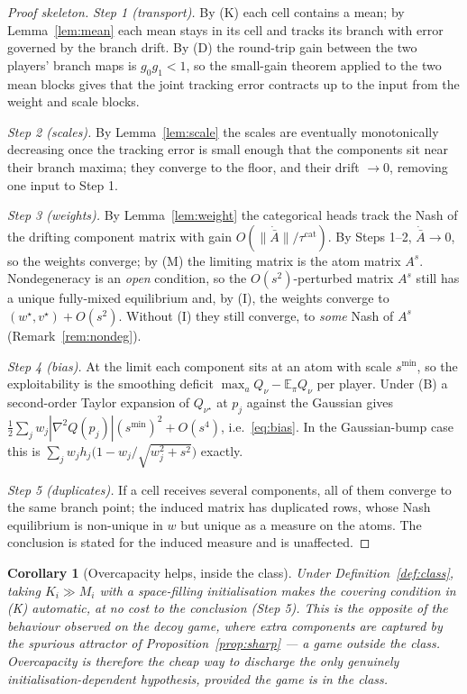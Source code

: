 \documentclass[11pt]{article}
\newtheorem{corollary}{Corollary}
\theoremstyle{definition}
\newcommand{\E}{\mathbb{E}}
\begin{document}
\begin{proof}[Proof skeleton]
\emph{Step 1 (transport).} By (K) each cell contains a mean; by
Lemma~\ref{lem:mean} each mean stays in its cell and tracks its branch with error
governed by the branch drift. By (D) the round-trip gain between the two players'
branch maps is $g_0 g_1 < 1$, so the small-gain theorem applied to the two mean
blocks gives that the joint tracking error contracts up to the input from the
weight and scale blocks.

\emph{Step 2 (scales).} By Lemma~\ref{lem:scale} the scales are eventually
monotonically decreasing once the tracking error is small enough that the
components sit near their branch maxima; they converge to the floor, and their
drift $\to 0$, removing one input to Step 1.

\emph{Step 3 (weights).} By Lemma~\ref{lem:weight} the categorical heads track
the Nash of the drifting component matrix with gain $O(\|\dot{\bar A}\|/
\tau^{\mathrm{cat}})$. By Steps 1--2, $\dot{\bar A} \to 0$, so the weights
converge; by (M) the limiting matrix is the atom matrix $A^s$. Nondegeneracy is
an \emph{open} condition, so the $O(s^2)$-perturbed matrix $A^s$ still has a
unique fully-mixed equilibrium and, by (I), the weights converge to
$(w^\star, v^\star) + O(s^2)$. Without (I) they still converge, to \emph{some}
Nash of $A^s$ (Remark~\ref{rem:nondeg}).

\emph{Step 4 (bias).} At the limit each component sits at an atom with scale
$s^{\min}$, so the exploitability is the smoothing deficit
$\max_a Q_{\nu} - \E_{\pi} Q_\nu$ per player. Under (B) a second-order Taylor
expansion of $Q_{\nu^\star}$ at $p_j$ against the Gaussian gives
$\tfrac12 \sum_j w_j |\nabla^2 Q(p_j)| (s^{\min})^2 + O(s^4)$, i.e.\
\eqref{eq:bias}. In the Gaussian-bump case this is
$\sum_j w_j h_j\big(1 - w_j/\sqrt{w_j^2 + s^2}\big)$ exactly.

\emph{Step 5 (duplicates).} If a cell receives several components, all of them
converge to the same branch point; the induced matrix has duplicated rows, whose
Nash equilibrium is non-unique in $w$ but unique as a measure on the atoms. The
conclusion is stated for the induced measure and is unaffected.
\end{proof}

\begin{corollary}[Overcapacity helps, inside the class]
Under Definition~\ref{def:class}, taking $K_i \gg M_i$ with a space-filling
initialisation makes the covering condition in (K) automatic, at no cost to the
conclusion (Step 5). This is the opposite of the behaviour observed on the decoy
game, where extra components are captured by the spurious attractor of
Proposition~\ref{prop:sharp} --- a game \emph{outside} the class. Overcapacity is
therefore the cheap way to discharge the only genuinely initialisation-dependent
hypothesis, provided the game is in the class.
\end{corollary}
\end{document}
